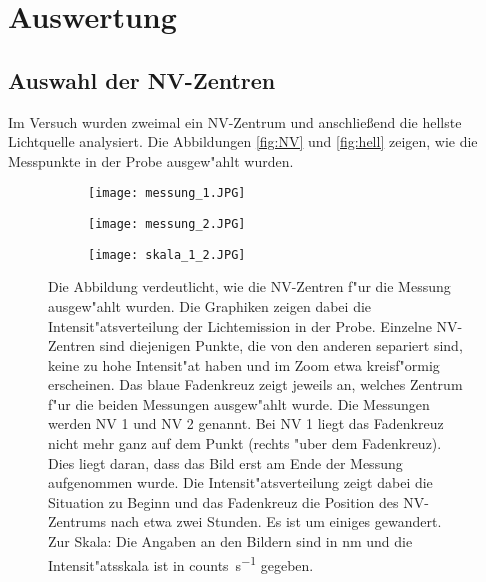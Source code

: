 \section{Auswertung}

\subsection{Auswahl der NV-Zentren}
Im Versuch wurden zweimal ein NV-Zentrum und anschlie\ss end die hellste Lichtquelle analysiert.
Die Abbildungen \vref{fig:NV} und \vref{fig:hell} zeigen, wie die Messpunkte in der Probe ausgew"ahlt wurden.
\begin{figure}[htbp]
    \begin{subfigure}[t][][b]{0.43\textwidth}
        \texttt{[image: messung\_1.JPG]}
        \label{fig:NV:1}
    \end{subfigure}
    \begin{subfigure}[t][][b]{0.42\textwidth}
        \texttt{[image: messung\_2.JPG]}
        \label{fig:NV:2}
    \end{subfigure}
    \hfill
    \begin{subfigure}[t][][b]{0.1\textwidth}
        \texttt{[image: skala\_1\_2.JPG]}
    \end{subfigure}
    \caption{
        Die Abbildung verdeutlicht, wie die NV-Zentren f"ur die Messung ausgew"ahlt wurden.
        Die Graphiken zeigen dabei die Intensit"atsverteilung der Lichtemission in der Probe.
        Einzelne NV-Zentren sind diejenigen Punkte, die von den anderen separiert sind, keine zu hohe Intensit"at haben und im Zoom etwa kreisf"ormig erscheinen.
        Das blaue Fadenkreuz zeigt jeweils an, welches Zentrum f"ur die beiden Messungen ausgew"ahlt wurde.
        Die Messungen werden NV 1 und NV 2 genannt.
        Bei NV 1 liegt das Fadenkreuz nicht mehr ganz auf dem Punkt (rechts "uber dem Fadenkreuz).
        Dies liegt daran, dass das Bild erst am Ende der Messung aufgenommen wurde.
        Die Intensit"atsverteilung zeigt dabei die Situation zu Beginn und das Fadenkreuz die Position des NV-Zentrums nach etwa zwei Stunden.
        Es ist um einiges gewandert.
        \\
        Zur Skala: Die Angaben an den Bildern sind in \si{\nano\metre} und die Intensit"atsskala ist in \si{counts\per\second} gegeben.
        }
    \label{fig:NV}
\end{figure}
